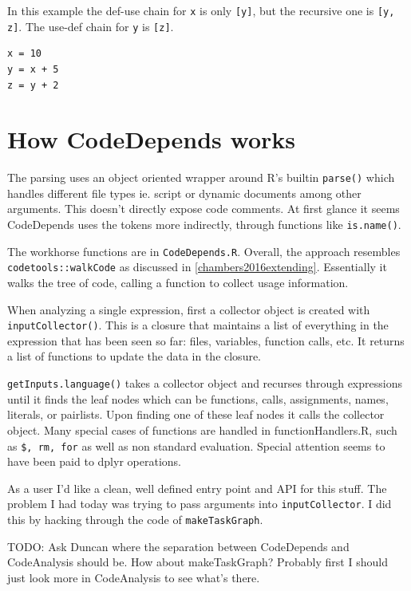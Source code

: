 \documentclass[12pt]{article}
\begin{document}
In this example the def-use chain for \texttt{x} is only \texttt{[y]}, but the
recursive one is \texttt{[y, z]}. The use-def chain for \texttt{y} is
\texttt{[z]}.

\begin{verbatim}
x = 10
y = x + 5
z = y + 2
\end{verbatim}

\section{How CodeDepends works}

The parsing uses an object oriented wrapper around R's builtin \texttt{parse()}
which handles different file types ie. script or dynamic documents among other arguments.
This doesn't directly expose code comments.
At first glance it seems CodeDepends uses the tokens
more indirectly, through functions like \texttt{is.name()}. 

The workhorse functions are in \texttt{CodeDepends.R}. Overall, the
approach resembles \texttt{codetools::walkCode} as discussed in
\ref{chambers2016extending}. Essentially it walks the tree of code, calling
a function to collect usage information.

When analyzing a single expression, first a 
collector object is created with \texttt{inputCollector()}. This is a
closure that maintains a list of everything in the expression that has been seen
so far: files, variables, function calls, etc. It returns a list of
functions to update the data in the closure.

\texttt{getInputs.language()} takes a collector object and
recurses through expressions until it finds the leaf nodes which can be functions, calls, assignments,
names, literals, or pairlists. Upon finding one of these leaf nodes it
calls the collector object. 
Many special cases of functions are handled in functionHandlers.R, such as
\texttt{\$, rm, for} as well as non standard evaluation. Special attention seems
to have been paid to dplyr operations.

As a user I'd like a clean, well defined entry point and API for this
stuff. The problem I had today was trying to pass arguments into
\texttt{inputCollector}. I did this by hacking through the code of
\texttt{makeTaskGraph}.

TODO: Ask Duncan where the separation between CodeDepends and CodeAnalysis
should be. How about makeTaskGraph? Probably first I should just look more
in CodeAnalysis to see what's there.
\end{document}
